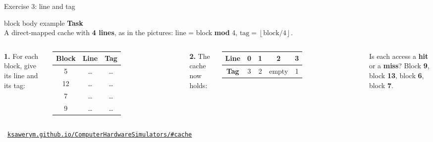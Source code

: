 \documentclass[aspectratio=169,10pt]{beamer}
\newcommand{\taskhead}[2]{%
  \begin{beamercolorbox}[rounded=true,sep=0.12cm,wd=\linewidth]{block body example}
    \small\textbf{#1}\\[0.04cm]
    \footnotesize #2
  \end{beamercolorbox}\vspace{0.1cm}}
\newcommand{\simbase}{https://ksawerym.github.io/ComputerHardwareSimulators/}
\newcommand{\simlink}[1]{\href{\simbase\##1}{\texttt{ksawerym.github.io/ComputerHardwareSimulators/\##1}}}
\newcommand{\simfoot}[1]{\par\vfill{\hfill\scriptsize\textcolor{gray}{\faLink\ #1}\par}}
\begin{document}
\begin{frame}{Exercise 3: line and tag}
  \taskhead{Task}{A direct-mapped cache with \textbf{4 lines}, as in the pictures: line = block \textbf{mod} 4,
    $\text{tag} = \left\lfloor \text{block} / 4 \right\rfloor$.}
  \begin{columns}[T,onlytextwidth]
      \footnotesize
      \textbf{1.} For each block, give its line and its tag:\\[0.1cm]
      \centering
      \renewcommand{\arraystretch}{1.2}
      \begin{tabular}{ccc}
        \toprule
        \textbf{Block} & \textbf{Line} & \textbf{Tag} \\
        \midrule
        5 & \ldots & \ldots \\ 12 & \ldots & \ldots \\ 7 & \ldots & \ldots \\ 9 & \ldots & \ldots \\
        \bottomrule
      \end{tabular}
      \footnotesize
      \textbf{2.} The cache now holds:\\[0.1cm]
      \centering
      \renewcommand{\arraystretch}{1.2}
      \begin{tabular}{ccccc}
        \toprule
        \textbf{Line} & 0 & 1 & 2 & 3 \\
        \midrule
        \textbf{Tag} & 3 & 2 & empty & 1 \\
        \bottomrule
      \end{tabular}\\[0.15cm]
      \raggedright
      Is each access a \textbf{hit} or a \textbf{miss}? Block \textbf{9}, block \textbf{13}, block \textbf{6}, block \textbf{7}.
  \end{columns}
  \simfoot{\simlink{cache}}
\end{frame}
\end{document}
